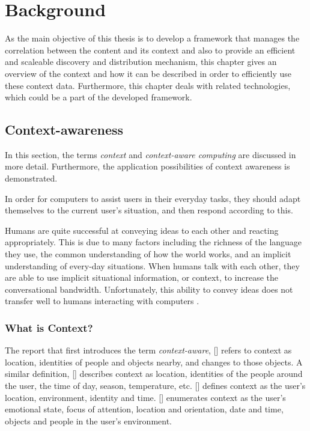 \chapter{Background\label{cha:chapter2}}
As the main objective of this thesis is to develop a framework that manages the correlation between the content and its context and also to provide an efficient and scaleable discovery and distribution mechanism, this chapter gives an overview of the context and how it can be described in order to efficiently use these context data. Furthermore, this chapter deals with related technologies, which could be a part of the developed framework.

\section{Context-awareness\label{sec:back_con_aw}}
In this section, the terms \textit{context} and \textit{context-aware computing} are discussed in more detail. Furthermore, the application possibilities of context awareness is demonstrated.

In order for computers to assist users in their everyday tasks, they should adapt themselves to the current user's situation, and then respond according to this. 

Humans are quite successful at conveying ideas to each other and reacting appropriately. This is due to many factors including the richness of the language they use, the common understanding of how the world works, and an implicit understanding of every-day situations. When humans talk with each other, they are able to use implicit situational information, or context, to increase the conversational bandwidth. Unfortunately, this ability to convey ideas does not transfer well to humans interacting with computers \cite{Dey2000b}.

\subsection{What is Context?}

The report that first introduces the term \emph{context-aware}, [\citeauthor{ieee313011}] refers to context as location, identities of people and objects nearby, and changes to those objects. A similar definition, [\citeauthor{ieee626984}] describes context as location, identities of the people around the user, the time of day, season, temperature, etc. [\citeauthor{Ryan97}] defines context as the user's location, environment, identity and time. [\citeauthor{Dey98}] enumerates context as the user's emotional state, focus of attention, location and orientation, date and time, objects and people in the user's environment.

